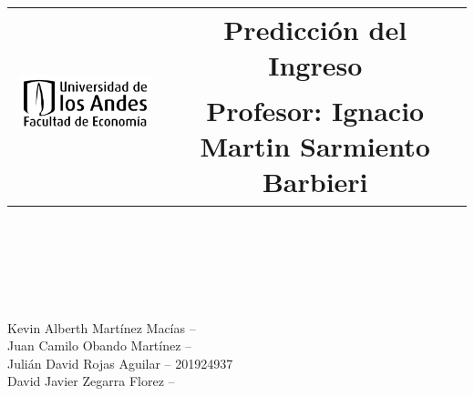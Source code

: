 \documentclass[12pt,a4paper,fleqn]{article}
\title{
\horrule{0.5pt} \\           %
\begin{table}[H]
	\centering
	\begin{tabular}{lc}
		\multirow{2}{*}{\includegraphics[scale=0.9]{Figuras/Andes.png}} & \textbf{Predicción del Ingreso}\\
		& \textbf{Profesor:} Ignacio Martin Sarmiento Barbieri
	\end{tabular}	
\end{table}
\horrule{2pt} \\ [0.5cm]            %
}
\author{}
\date{}
\begin{document}
    \maketitle
    \thispagestyle{empty}
    
    \vspace*{-3cm}
    
    \begin{flushright}
        Kevin Alberth Martínez Macías -- \\
        Juan Camilo Obando Martínez -- \\
        Julián David Rojas Aguilar -- 201924937 \\
        David Javier Zegarra Florez -- \\
    \end{flushright}
    
    
    
\end{document}
